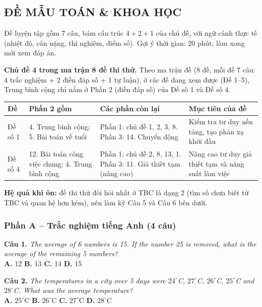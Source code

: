 \documentclass[../main.tex]{subfiles}
\begin{document}
\subsection{ĐỀ MẪU TOÁN \& KHOA HỌC}
Đề luyện tập gồm 7 câu, bám cấu trúc $4 + 2 + 1$ của chủ đề, với ngữ cảnh thực tế (nhiệt độ, cân nặng, thí nghiệm, điểm số). Gợi ý thời gian: 20 phút; làm xong mới xem đáp án.

\begin{hd}
    \textbf{Chủ đề 4 trong ma trận 8 đề thi thử.} Theo ma trận đề (8 đề, mỗi đề 7 câu: 4 trắc nghiệm + 2 điền đáp số + 1 tự luận), ở các đề đang xem được (Đề 1--5), Trung bình cộng chỉ nằm ở Phần 2 (điền đáp số) của Đề số 1 và Đề số 4.
\end{hd}
\begin{center}
\begin{tabular}{|S{1.8cm}|S{5.2cm}|S{4.6cm}|S{3.6cm}|}
    \hline
    \textbf{Đề} & \textbf{Phần 2 gồm} & \textbf{Các phần còn lại} & \textbf{Mục tiêu của đề} \\
    \hline
    Đề số 1 & 4. Trung bình cộng; 5. Bài toán về tuổi & Phần 1: chủ đề 1, 2, 3, 8. Phần 3: 14. Chuyển động & Kiểm tra tư duy nền tảng, tạo phản xạ khởi đầu \\
    \hline
    Đề số 4 & 12. Bài toán công việc chung; 4. Trung bình cộng & Phần 1: chủ đề 2, 8, 13, 1. Phần 3: 11. Giả thiết tạm (nâng cao) & Nâng cao tư duy giả thiết tạm và năng suất làm việc \\
    \hline
\end{tabular}
\end{center}
\textbf{Hệ quả khi ôn:} đề thi thử đòi hỏi nhất ở TBC là dạng 2 (tìm số chưa biết từ TBC và quan hệ hơn kém), nên làm kỹ Câu 5 và Câu 6 bên dưới.

\subsubsection{Phần A -- Trắc nghiệm tiếng Anh (4 câu)}
\textbf{Câu 1.} \textit{The average of 6 numbers is 15. If the number 25 is removed, what is the average of the remaining 5 numbers?}\\
\textbf{A.} 12 \qquad \textbf{B.} 13 \qquad \textbf{C.} 14 \qquad \textbf{D.} 15

\medskip
\textbf{Câu 2.} \textit{The temperatures in a city over 5 days were $24^\circ$C, $27^\circ$C, $26^\circ$C, $25^\circ$C and $28^\circ$C. What was the average temperature?}\\
\textbf{A.} $25^\circ$C \qquad \textbf{B.} $26^\circ$C \qquad \textbf{C.} $27^\circ$C \qquad \textbf{D.} $28^\circ$C
\end{document}
